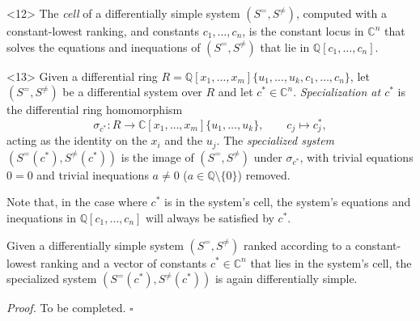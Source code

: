 \documentclass{article}
\theoremstyle{definition}
\theoremstyle{plain}
\newcommand{\qedbox}{\hspace*{\fill}\ensuremath{\square}}
\begin{document}
\begin{definition}<12>
The {\it cell} of a differentially simple system $(S^=, S^{\ne})$, computed with a constant-lowest ranking,
and constants $c_1,\ldots,c_n$,
is the constant locus in $\mathbb{C}^n$ that solves the equations and inequations of $(S^=, S^{\ne})$
that lie in $\mathbb{Q}[c_1, \ldots, c_n]$.
\end{definition}

  \begin{definition}<13>
  \label{def:specialized system}
  Given a differential ring $R = \mathbb{Q}[x_1, \ldots, x_m]\{u_1, \ldots, u_k, c_1, \ldots, c_n\}$,
  let $(S^=, S^{\ne})$ be a differential system over $R$ and let
  $c^* \in \mathbb{C}^n$.  {\it Specialization at $c^*$} is the differential ring
  homomorphism
  \[
  \sigma_{c^*} : R \longrightarrow \mathbb{C}[x_1, \ldots, x_m]\{u_1, \ldots, u_k\},
  \qquad c_j \mapsto c_j^* ,
  \]
  acting as the identity on the $x_i$ and the $u_j$.
  The {\it specialized system} $(S^=(c^*), S^{\ne}(c^*))$ is the
  image of $(S^=, S^{\ne})$ under $\sigma_{c^*}$, with trivial equations $0 = 0$ and
  trivial inequations $a \ne 0$ ($a \in \mathbb{Q} \setminus \{0\}$) removed.
  \end{definition}

Note that, in the case where $c^*$ is in the system's cell, the system's equations and inequations in $\mathbb{Q}[c_1, \ldots, c_n]$
will always be satisfied by $c^*$.

\begin{lemma}
\label{lem:specialization}
      Given a differentially simple system $(S^=, S^{\ne})$ ranked according to a constant-lowest ranking
      and a vector of constants $c^* \in \mathbb{C}^n$ that lies in the system's cell,
      the specialized system $(S^=(c^*), S^{\ne}(c^*))$ is again differentially simple.
\end{lemma}
{\it Proof.}
To be completed.
\qedbox
\end{document}
